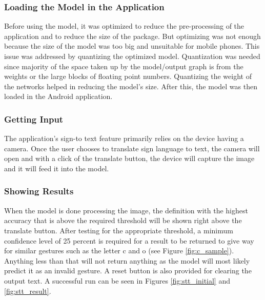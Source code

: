 \documentclass[journal]{./IEEE/IEEEtran}
\begin{document}
\subsubsection{Loading the Model in the Application}
Before using the model, it was optimized to reduce the pre-processing of the application and to reduce the size of the package. But optimizing was not enough because the size of the model was too big and unsuitable for mobile phones. This issue was addressed by quantizing the optimized model.
\newline
\indent Quantization was needed since majority of the space taken up by the model/output graph is from the weights or the large blocks of floating point numbers. Quantizing the weight of the networks helped in reducing the model's size. After this, the model was then loaded in the Android application.
\newline
\subsubsection{Getting Input}
The application's sign-to text feature primarily relies on the device having a camera. Once the user chooses to translate sign language to text, the camera will open and with a click of the translate button, the device will capture the image and it will feed it into the model.
\newline
\subsubsection{Showing Results}
When the model is done processing the image, the definition with the highest accuracy that is above the required threshold will be shown right above the translate button.
\newline
\indent After testing for the appropriate threshold, a minimum confidence level of 25 percent is required for a result to be returned to give way for similar gestures such as the letter c and o (see Figure \ref{fig:c_sample}). Anything less than that will not return anything as the model will most likely predict it as an invalid gesture. A reset button is also provided for clearing the output text. A successful run can be seen in Figures \ref{fig:stt_initial} and \ref{fig:stt_result}.
\end{document}
